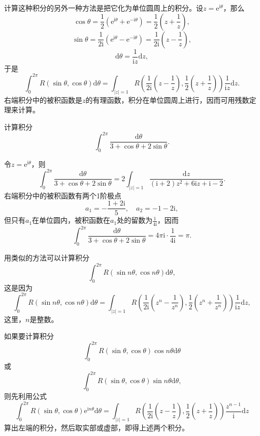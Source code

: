 \documentclass[../../main.tex]{subfiles}%
\begin{document}
计算这种积分的另外一种方法是把它化为单位圆周上的积分。设\( z = \mathrm{e}^{\mathrm{i}\theta} \)，那么
\[
\cos\theta = \frac{1}{2} (\mathrm{e}^{\mathrm{i}\theta} + \mathrm{e}^{-\mathrm{i}\theta}) = \frac{1}{2} \left( z + \frac{1}{z} \right),
\]
\[
\sin\theta = \frac{1}{2\mathrm{i}} (\mathrm{e}^{\mathrm{i}\theta} - \mathrm{e}^{-\mathrm{i}\theta}) = \frac{1}{2\mathrm{i}} \left( z - \frac{1}{z} \right),
\]
\[
\mathrm{d}\theta = \frac{1}{\mathrm{i}z} \mathrm{d}z,
\]
于是
\[
\int_{0}^{2\pi} R(\sin\theta, \cos\theta) \mathrm{d}\theta = \int_{|z| = 1} R\left( \frac{1}{2\mathrm{i}} \left( z - \frac{1}{z} \right), \frac{1}{2} \left( z + \frac{1}{z} \right) \right) \frac{1}{\mathrm{i}z} \mathrm{d}z.
\]
右端积分中的被积函数是\( z \)的有理函数，积分在单位圆周上进行，因而可用残数定理来计算。

\begin{example}
计算积分
\[
\int_{0}^{2\pi} \frac{\mathrm{d}\theta}{3 + \cos\theta + 2\sin\theta}.
\]
\end{example}
\begin{solution}
令\( z = \mathrm{e}^{\mathrm{i}\theta} \)，则
\[
\int_{0}^{2\pi} \frac{\mathrm{d}\theta}{3 + \cos\theta + 2\sin\theta} = 2 \int_{|z| = 1} \frac{\mathrm{d}z}{(\mathrm{i} + 2)z^2 + 6\mathrm{i}z + \mathrm{i} - 2}.
\]
右端积分中的被积函数有两个1阶极点
\[
a_1 = -\frac{1 + 2\mathrm{i}}{5}, \quad a_2 = -1 - 2\mathrm{i},
\]
但只有\( a_1 \)在单位圆内，被积函数在\( a_1 \)处的留数为\( \frac{1}{4\mathrm{i}} \)，因而
\[
\int_{0}^{2\pi} \frac{\mathrm{d}\theta}{3 + \cos\theta + 2\sin\theta} = 4\pi \mathrm{i} \cdot \frac{1}{4\mathrm{i}}
= \pi.
\]

\end{solution}

用类似的方法可以计算积分
\[
\int_{0}^{2\pi} R(\sin n\theta, \cos n\theta) \mathrm{d}\theta,
\]
这是因为
\[
\int_{0}^{2\pi} R(\sin n\theta, \cos n\theta) \mathrm{d}\theta = \int_{|z| = 1} R\left( \frac{1}{2\mathrm{i}} \left( z^n - \frac{1}{z^n} \right), \frac{1}{2} \left( z^n + \frac{1}{z^n} \right) \right) \frac{1}{\mathrm{i}z} \mathrm{d}z,
\]
这里，\( n \)是整数。

如果要计算积分
\[
\int_{0}^{2\pi} R(\sin\theta, \cos\theta) \cos n\theta \mathrm{d}\theta
\]
或
\[
\int_{0}^{2\pi} R(\sin\theta, \cos\theta) \sin n\theta \mathrm{d}\theta,
\]
则先利用公式
\[
\int_{0}^{2\pi} R(\sin\theta, \cos\theta) \mathrm{e}^{\mathrm{i}n\theta} \mathrm{d}\theta = \int_{|z| = 1} R\left( \frac{1}{2\mathrm{i}} \left( z - \frac{1}{z} \right), \frac{1}{2} \left( z + \frac{1}{z} \right) \right) \frac{z^{n - 1}}{\mathrm{i}} \mathrm{d}z \label{formula10}
\]
算出左端的积分，然后取实部或虚部，即得上述两个积分。
\end{document}
